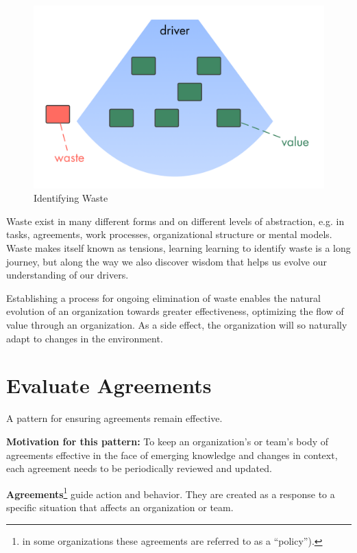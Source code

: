 \begin{figure}[htbp]
\centering
\includegraphics[keepaspectratio,width=\textwidth,height=0.75\textheight]{img/workflow-and-value/drivers-value-waste.png}
\caption{Identifying Waste}
\end{figure}

Waste exist in many different forms and on different levels of abstraction, e.g. in tasks, agreements, work processes, organizational structure or mental models. Waste makes itself known as tensions, learning learning to identify waste is a long journey, but along the way we also discover wisdom that helps us evolve our understanding of our drivers.

Establishing a process for ongoing elimination of waste enables the natural evolution of an organization towards greater effectiveness, optimizing the flow of value through an organization. As a side effect, the organization will so naturally adapt to changes in the environment.

\section{Evaluate Agreements}
\label{evaluateagreements}

A pattern for ensuring agreements remain effective.

\textbf{Motivation for this pattern:} To keep an organization's or team's body of agreements effective in the face of emerging knowledge and changes in context, each agreement needs to be periodically reviewed and updated.

\textbf{Agreements}\footnote{in some organizations these agreements are referred to as a ``policy'').} guide action and behavior. They are created as a response to a specific situation that affects an organization or team.


